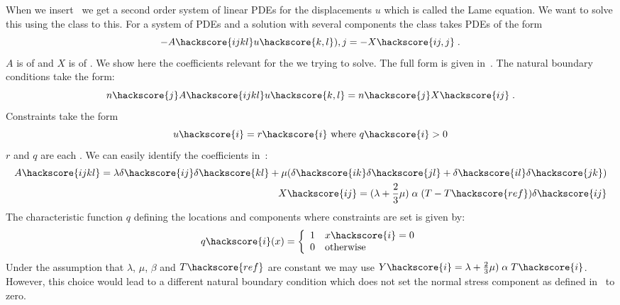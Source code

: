 When we insert~ we get a second order system of linear PDEs for the displacements $u$ which is called
the Lame equation. We want to solve
this using the \LinearPDE class to this. For a system of PDEs and a solution with several components the \LinearPDE class 
takes PDEs of the form
\begin{equation}\label{LINEARPDE.SYSTEM.1 TUTORIAL}
-A\hackscore{ijkl} u\hackscore{k,l}){,j}=-X\hackscore{ij,j} \; .
\end{equation}
$A$ is of \RankFour and $X$ is of \RankTwo. We show here the coefficients relevant 
for the we trying to solve. The full form is given in~. 
The natural boundary conditions  take the form:
\begin{equation}\label{LINEARPDE.SYSTEM.2 TUTORIAL}
n\hackscore{j} A\hackscore{ijkl} u\hackscore{k,l}=n\hackscore{j}X\hackscore{ij} \;.
\end{equation}
Constraints  take the form
\begin{equation}\label{LINEARPDE.SYSTEM.3 TUTORIAL}
u\hackscore{i}=r\hackscore{i} \mbox{ where } q\hackscore{i}>0
\end{equation}
$r$ and $q$ are each \RankOne. 
We can easily identify the coefficients in~:
\begin{eqnarray}\label{LINEARPDE ELASTIC COEFFICIENTS}
A\hackscore{ijkl}=\lambda \delta\hackscore{ij} \delta\hackscore{kl} + \mu ( 
\delta\hackscore{ik} \delta\hackscore{jl}
+ \delta\hackscore{il} \delta\hackscore{jk}) \\
X\hackscore{ij}=(\lambda+\frac{2}{3} \mu) \;  \alpha \; (T-T\hackscore{ref})\delta\hackscore{ij} \\
\end{eqnarray}
The characteristic function $q$ defining the locations and components where constraints are set is given by:
\begin{equation}\label{HEATEDBLOCK MASK}
q\hackscore{i}(x)=\left\{ 
\begin{array}{cl}
1  & x\hackscore{i}=0  \\ 
0  & \mbox{otherwise}   \\
\end{array}
\right. 
\end{equation}
Under the assumption that $\lambda$, $\mu$, $\beta$ and $T\hackscore{ref}$ 
are constant we may use $Y\hackscore{i}=\lambda+\frac{2}{3} \mu) \; \alpha \; T\hackscore{i}$. However,
this choice would lead to a different natural boundary condition which does not set the normal stress component as defined
in~ to zero.

